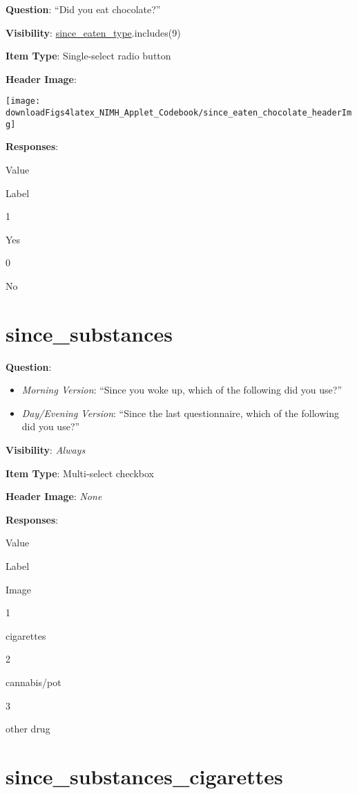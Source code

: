 \documentclass[]{book}
\providecommand{\tightlist}{%
  \setlength{\itemsep}{0pt}\setlength{\parskip}{0pt}}
\begin{document}
\textbf{Question}: ``Did you eat chocolate?''

\textbf{Visibility}: \protect\hyperlink{since_eaten_type}{since\_eaten\_type}.includes(9)

\textbf{Item Type}: Single-select radio button

\textbf{Header Image}:

\begin{flushleft}\texttt{[image: downloadFigs4latex\_NIMH\_Applet\_Codebook/since\_eaten\_chocolate\_headerImg]} \end{flushleft}

\textbf{Responses}:

Value

Label

1

Yes

0

No

\hypertarget{since_substances}{%
\section{since\_substances}\label{since_substances}}

\textbf{Question}:

\begin{itemize}
\tightlist
\item
  \emph{Morning Version}: ``Since you woke up, which of the following did you use?''
\item
  \emph{Day/Evening Version}: ``Since the last questionnaire, which of the following did you use?''
\end{itemize}

\textbf{Visibility}: \emph{Always}

\textbf{Item Type}: Multi-select checkbox

\textbf{Header Image}: \emph{None}

\textbf{Responses}:

Value

Label

Image

1

cigarettes

2

cannabis/pot

3

other drug

\hypertarget{since_substances_cigarettes}{%
\section{since\_substances\_cigarettes}\label{since_substances_cigarettes}}
\end{document}
